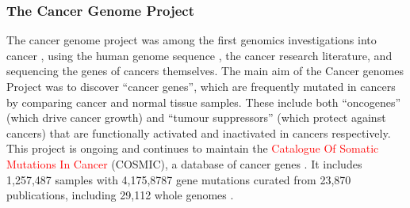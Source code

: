 \subsubsection{The Cancer Genome Project}
The cancer genome project %
was among the first \glspl{genomic} investigations into cancer \citep{Dickson1999}, using the human \gls{genome} sequence \citep{Lander2001, Collins2007}, the cancer research literature, and sequencing the genes of cancers themselves. 
The main aim of the Cancer \Glspl{genome} Project was to discover ``\glspl{cancer gene}'', which are frequently mutated in cancers by comparing cancer and normal tissue samples. These include both ``\glspl{oncogene}'' (which drive  cancer growth) and ``\glspl{tumour suppressor}'' (which protect against cancers) that are functionally activated and inactivated in cancers respectively. This project is ongoing and continues to %
%
maintain the \textcolor{red}{Catalogue Of Somatic Mutations In Cancer} (COSMIC), a database of \glspl{cancer gene} \citep{COSMICdb}. %
It includes 1,257,487 samples with 4,175,8787 gene \glspl{mutation} curated from 23,870 publications, including 29,112 whole \glspl{genome} \citep{COSMICdb}.

